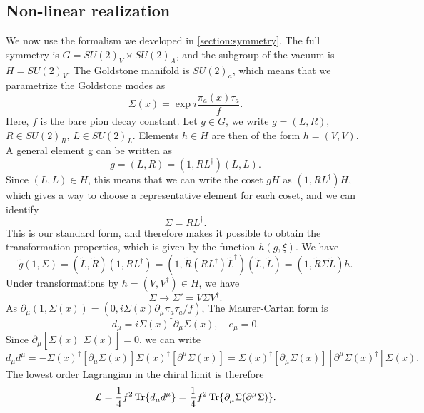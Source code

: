 \subsection*{Non-linear realization}
We now use the formalism we developed in \autoref{section:symmetry}.
The full symmetry is $G = SU(2)_V\times SU(2)_A$, and the subgroup of the vacuum is $H = SU(2)_V$.
The Goldstone manifold is $SU(2)_a$, which means that we parametrize the Goldstone modes as
\begin{equation}
    \Sigma(x) = \exp{i \frac{\pi_a(x) \tau_a}{f} }.
\end{equation}
Here, $f$ is the bare pion decay constant.
Let $g\in G$, we write $g = (L, R)$, $R \in SU(2)_R$, $L \in SU(2)_L$.
Elements $h \in H$ are then of the form $h = (V, V)$.
A general element g can be written as
\begin{equation}
    g = (L, R) = (1, R L^\dagger) (L, L).
\end{equation}
Since $(L, L) \in H$, this means that we can write the coset $g H$ as $(1, R L^\dagger)H$, which gives a way to choose a representative element for each coset, and we can identify
\begin{equation}
    \Sigma = R L^\dagger. 
\end{equation}
This is our standard form, and therefore makes it possible to obtain the transformation properties, which is given by the function $h(g, \xi)$.
We have 
\begin{equation}
    \tilde g (1, \Sigma)
    = (\tilde L, \tilde R) (1, R L^\dagger)
    = (1, \tilde R (R L^\dagger) \tilde L^\dagger) (\tilde L, \tilde L)
    = (1, \tilde R \Sigma \tilde L) h.
\end{equation}
Under transformations by $h = (V, V^\dagger) \in H$, we have
\begin{equation}
    \Sigma \rightarrow \Sigma' = V \Sigma V^\dagger.
\end{equation}
As $\partial_\mu  (1, \Sigma(x)) = (0, i \Sigma(x) \partial_\mu \pi_a\tau_a/f )$, 
The Maurer-Cartan form is
\begin{equation}
    d_\mu = i \Sigma(x)^\dagger \partial_\mu \Sigma(x),\quad
    e_\mu = 0.
\end{equation}
Since $\partial_\mu [\Sigma(x)^\dagger\Sigma(x)] = 0 $, we can write
\begin{equation}
    d_\mu d^\mu = 
    - \Sigma(x)^\dagger [\partial_\mu \Sigma(x)] \Sigma(x)^\dagger [\partial^\mu \Sigma(x)]
    =\Sigma(x)^\dagger [\partial_\mu \Sigma(x)] [\partial^\mu \Sigma(x)^\dagger] \Sigma(x).
\end{equation}
The lowest order Lagrangian in the chiral limit is therefore
\begin{equation}
    \mathcal{L} = \frac{1}{4} f^2 \Tr{d_\mu d^\mu} = \frac{1}{4}f^2 \Tr{\partial_\mu \Sigma (\partial^\mu \Sigma)}.
\end{equation}

